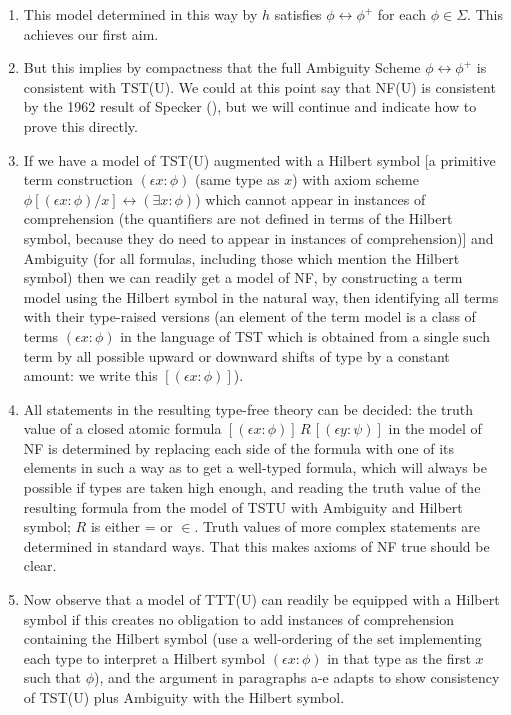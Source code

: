 \documentclass[112pt]{article}
\begin{document}
\begin{description}
\begin{enumerate}
\begin{enumerate}
\item This model determined in this way by $h$ satisfies  $\phi \leftrightarrow \phi^+$ for each $\phi \in \Sigma$.   This achieves our first aim.

\item But this implies by compactness that the full Ambiguity Scheme $\phi \leftrightarrow \phi^+$ is consistent with TST(U).  We could at this point say that  NF(U) is consistent by the 1962 result of Specker (\cite{ambiguity}), but we will continue and indicate how to prove this directly.

\item If we have a model of TST(U) augmented with a Hilbert symbol [a primitive term construction $(\epsilon x:\phi)$ (same type as $x$) with axiom scheme $\phi[(\epsilon x:\phi)/x] \leftrightarrow (\exists x:\phi)$) which cannot appear in instances of comprehension (the quantifiers are not defined in terms of the Hilbert symbol, because they do need to appear in instances of comprehension)] and Ambiguity (for all formulas, including those which mention the Hilbert symbol) then we can readily get a model of NF, by constructing a term model using the Hilbert symbol in the natural way, then identifying all terms with their type-raised versions (an element of the term model is a class of terms $(\epsilon x:\phi)$ in the language of TST which is obtained from a single such term by all possible upward or downward shifts of type by a constant amount:  we write this
$[(\epsilon x:\phi)]$).


\item All statements in the resulting type-free theory can be decided:  the truth value of a closed atomic formula $[(\epsilon x:\phi)] \,R\, [(\epsilon y:\psi)]$ in the model of NF is determined by replacing each side of the formula with one of its elements in such a way as to get a well-typed formula, which will always be possible if types are taken high enough, and reading the truth value of the resulting formula  from the model of TSTU with Ambiguity and Hilbert symbol;  $R$ is either = or $\in$.  Truth values of more complex statements are determined in standard ways.  That this makes axioms of NF true should be clear.

\item  Now observe that a model of TTT(U) can readily be equipped with a Hilbert symbol if this creates no obligation to add instances of comprehension
containing the Hilbert symbol (use a well-ordering of the set implementing each type to interpret a Hilbert symbol  $(\epsilon x:\phi)$ in that type as the first $x$ such that $\phi$), and the argument in paragraphs a-e adapts to show consistency of TST(U) plus Ambiguity with the Hilbert symbol.


\end{enumerate}
\end{enumerate}
\end{description}
\end{document}
